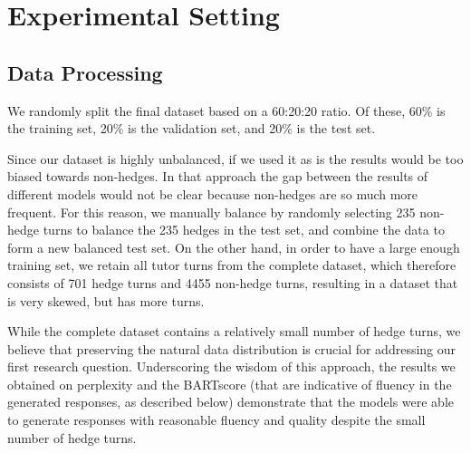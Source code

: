 \documentclass[11pt]{article}
\begin{document}
\section{Experimental Setting}

\subsection{Data Processing}
We randomly split the final dataset based on a 60:20:20 ratio. Of these, 60\% is the training set, 20\% is the validation set, and 20\% is the test set.  

Since our dataset is highly unbalanced, if we used it as is the results would be too biased towards non-hedges. In that approach the gap between the results of different models would not be clear because non-hedges are so much more frequent. For this reason, we manually balance by randomly selecting 235 non-hedge turns to balance the 235 hedges in the test set, and combine the data to form a new balanced test set. On the other hand, in order to have a large enough training set, we retain all tutor turns from the complete dataset, which therefore consists of 701 hedge turns and 4455 non-hedge turns, resulting in a dataset that is very skewed, but has more turns. 

While the complete dataset contains a relatively small number of hedge turns, we believe that preserving the natural data distribution is crucial for addressing our first research question. Underscoring the wisdom of this approach, the results we obtained on perplexity and the BARTscore (that are indicative of fluency in the generated responses, as described below) demonstrate that the models were able to generate responses with reasonable fluency and quality despite the small number of hedge turns.

\end{document}
